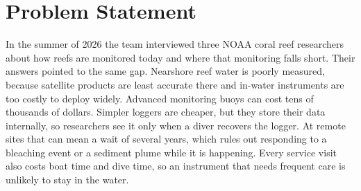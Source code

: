 \section{Problem Statement} %

In the summer of 2026 the team interviewed three NOAA coral reef researchers about how reefs are monitored today and where that monitoring falls short. Their answers pointed to the same gap. Nearshore reef water is poorly measured, because satellite products are least accurate there and in-water instruments are too costly to deploy widely. Advanced monitoring buoys can cost tens of thousands of dollars. Simpler loggers are cheaper, but they store their data internally, so researchers see it only when a diver recovers the logger. At remote sites that can mean a wait of several years, which rules out responding to a bleaching event or a sediment plume while it is happening. Every service visit also costs boat time and dive time, so an instrument that needs frequent care is unlikely to stay in the water.

